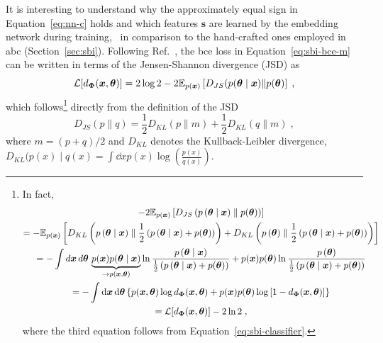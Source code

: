 

It is interesting to understand why the approximately equal sign in Equation~\eqref{eq:nn-c} holds and which features $\boldsymbol{s}$ are learned by the embedding network during training, \eg~in comparison to the hand-crafted ones employed in \gls*{abc} (Section~\ref{sec:sbi}). Following Ref.~\cite{Cole:2021gwr}, the \gls*{bce} loss in Equation~\eqref{eq:sbi-bce-m} can be written in terms of the Jensen-Shannon divergence (JSD) as
\begin{equation}
   \mathcal{L}[d_{\bm{\Phi}}(\bm{x}, \bm{\theta})] = 2 \log2 - 2\mathbb{E}_{p(\bm{x})}\left[D_{JS}(p(\bm{\theta}\mid\bm{x})\| p(\bm{\theta})\right] \;,
\end{equation}
which follows\footnote{
   In fact,
   \begin{multline}
   -2\mathbb{E}_{p(\bm{x})}\left[D_{JS}\left(p\left(\bm{\theta}\mid\bm{x}\right) \parallel  p(\bm{\theta})\right)\right] \\
   =-\mathbb{E}_{p(\bm{x})}\left[
      D_{KL}\left(p\left(\bm{\theta}\mid\bm{x}\right) \parallel \frac12\left(p\left(\bm{\theta}\mid\bm{x}\right) + p(\bm{\theta})\right)\right)
      +D_{KL}\left(p\left(\bm{\theta}\right) \parallel \frac12\left(p\left(\bm{\theta}\mid\bm{x}\right) + p(\bm{\theta})\right)\right)\right]\\
   = -\int d\bm{x}\, d\bm{\theta}\,
   \underbrace{p(\bm{x})p(\bm{\theta}\mid\bm{x})}_{\to p(\bm{x}, \bm{\theta})} \ln \frac{p\left(\bm{\theta}\mid\bm{x}\right) }{ \frac12\left(p\left(\bm{\theta}\mid\bm{x}\right) + p(\bm{\theta})\right)}
   +p(\bm{x})p(\bm{\theta}) \ln \frac{p\left(\bm{\theta}\right) }{ \frac12\left(p\left(\bm{\theta}\mid\bm{x}\right) + p(\bm{\theta})\right)}\\
   = -\int \dd{\ensuremath{\bm{x}}} \dd{\ensuremath{\bm{\theta}}} \left\{ p(\bm{x}, \bm{\theta}) \log d_{\bm{\Phi}}(\bm{x}, \bm{\theta}) \notag + p(\bm{x}) p(\bm{\theta}) \log\left[ 1 - d_{\bm{\Phi}}(\bm{x}, \bm{\theta}) \right] \right\} \\
   = \mathcal{L}[d_{\bm{\Phi}}(\bm{x}, \bm{\theta})] - 2\ln 2 \;,
\end{multline}
where the third equation follows from Equation~\eqref{eq:sbi-classifier}.
}
directly from the definition of the JSD
\begin{equation}
    D_{JS}(p\| q) = \frac{1}{2}D_{KL}(p \parallel m)+\frac{1}{2}D_{KL}(q \parallel m)\;,
\end{equation}
where $m=(p+q)/2$ and $D_{KL}$ denotes the Kullback-Leibler divergence, $D_{KL}(p(x) \mid q(x) = \int \dd x p(x) \log\left(\frac{p(x)}{q(x)}\right)$.

